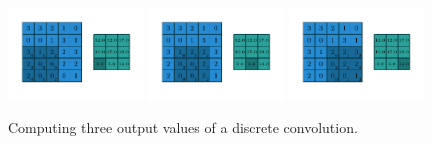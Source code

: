 \documentclass{report}
\begin{document}
\begin{figure}[p]
    \includegraphics[width=0.32\textwidth]{pdf/numerical_no_padding_no_strides_06.pdf}
    \includegraphics[width=0.32\textwidth]{pdf/numerical_no_padding_no_strides_07.pdf}
    \includegraphics[width=0.32\textwidth]{pdf/numerical_no_padding_no_strides_08.pdf}
    \caption{\label{fig:numerical_no_padding_no_strides} Computing three output
        values of a discrete convolution.}
\end{figure}
\end{document}
